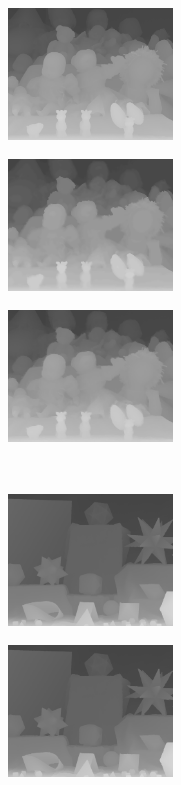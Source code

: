 \documentclass[preprint,10pt,5p,times,twocolumn]{elsarticle}
\begin{document}
\begin{figure}
\begin{subfigure}[b]{0.24\textwidth}
\end{subfigure}
\begin{subfigure}[b]{0.24\textwidth}
\includegraphics[height= 3.5cm, width=\textwidth]{fig_dolls_8X_lqdai.png}
\end{subfigure}
\begin{subfigure}[b]{0.24\textwidth}
\includegraphics[height= 3.5cm, width=\textwidth]{fig_dolls_8X_cvpr.png}
\end{subfigure}
\begin{subfigure}[b]{0.24\textwidth}
\includegraphics[height= 3.5cm, width=\textwidth]{fig_dolls_8X_iccv.png}
\end{subfigure}
\\ \vspace{0.1cm}
\begin{subfigure}[b]{0.24\textwidth}
\includegraphics[height= 3.5cm, width=\textwidth]{fig_moebius.png}
\end{subfigure}
\begin{subfigure}[b]{0.24\textwidth}
\includegraphics[height= 3.5cm, width=\textwidth]{fig_moebius_8X_lqdai.png}

\end{subfigure}
\end{figure}
\end{document}
